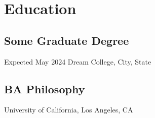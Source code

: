 

\section{Education}
\subsection{Some Graduate Degree}{}{Expected May 2024}
Dream College, City, State \hfill 

\subsection{BA Philosophy}{}{}
University of California, Los Angeles, CA \hfill 

\vspace{0.2em}